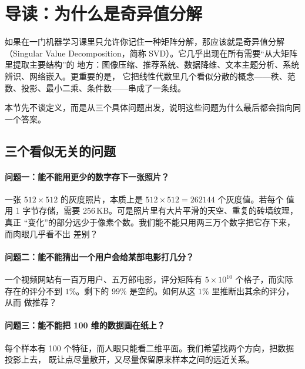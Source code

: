 \documentclass[UTF8, 11pt, a4paper, fontset=windows]{ctexart}
\theoremstyle{cnthm}
\theoremstyle{cndef}
\begin{document}
\setcounter{page}{1}
\pagestyle{plain}
\tableofcontents
\clearpage
\pagestyle{fancy}

\setcounter{page}{1}

\section{导读：为什么是奇异值分解}

如果在一门机器学习课里只允许你记住一种矩阵分解，那应该就是奇异值分解（Singular
Value Decomposition，简称 SVD）。它几乎出现在所有需要“从大矩阵里提取主要结构”的
地方：图像压缩、推荐系统、数据降维、文本主题分析、系统辨识、网络嵌入。更重要的是，
它把线性代数里几个看似分散的概念——秩、范数、投影、最小二乘、条件数——串成了一条线。

本节先不谈定义，而是从三个具体问题出发，说明这些问题为什么最后都会指向同一个答案。

\subsection{三个看似无关的问题}

\paragraph{问题一：能不能用更少的数字存下一张照片？}
一张 $512\times 512$ 的灰度照片，本质上是 $512\times 512=262144$ 个灰度值。若每个
值用 1 字节存储，需要 256\,KB。可是照片里有大片平滑的天空、重复的砖墙纹理，真正
“变化”的部分远少于像素个数。我们能不能只用两三万个数字把它存下来，而肉眼几乎看不出
差别？

\paragraph{问题二：能不能猜出一个用户会给某部电影打几分？}
一个视频网站有一百万用户、五万部电影，评分矩阵有 $5\times 10^{10}$ 个格子，而实际
存在的评分不到 $1\%$。剩下的 $99\%$ 是空的。如何从这 $1\%$ 里推断出其余的评分，从而
做推荐？

\paragraph{问题三：能不能把 100 维的数据画在纸上？}
每个样本有 100 个特征，而人眼只能看二维平面。我们希望找两个方向，把数据投影上去，
既让点尽量散开，又尽量保留原来样本之间的远近关系。
\end{document}
